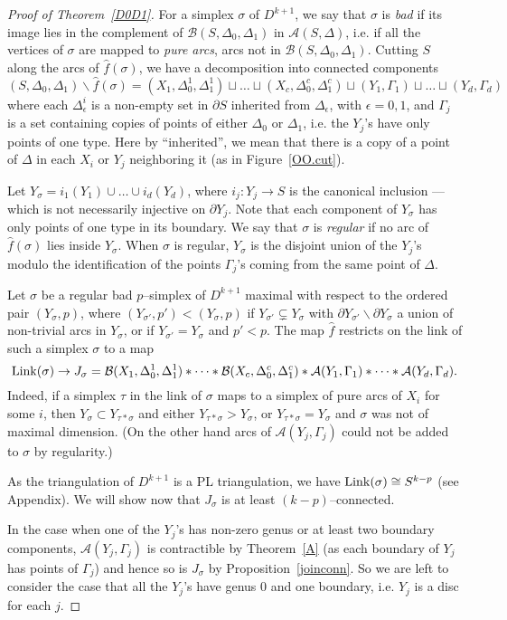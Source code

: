 \documentclass[10pt]{amsart}
\newcommand{\A}{\mathcal{A}}
\newcommand{\BB}{\mathcal{B}}
\newcommand{\Ga}{\Gamma}
\newcommand{\De}{\Delta}
\newcommand{\s}{\sigma}
\newcommand{\minus}{\backslash}
\newcommand{\del}{\partial}
\begin{document}
\begin{proof}[Proof of Theorem~\ref{D0D1}]
For a simplex $\s$ of $D^{k+1}$, we say that $\s$ is {\em bad} if its image lies in the complement of $\BB(S,\De_0,\De_1)$ in
$\A(S,\De)$,  i.e. if all the vertices of $\s$ are mapped to {\em pure arcs}, arcs not in $\BB(S,\De_0,\De_1)$.
 Cutting $S$ along the arcs of $\hat f(\s)$, we have a decomposition into connected components 
$$(S,\De_0,\De_1)\minus \hat f(\s)=(X_1,\De_0^1,\De^1_1)\sqcup\dots\sqcup (X_c,\De_0^c,\De_1^c)\sqcup (Y_1,\Ga_1)\sqcup \dots\sqcup (Y_d,\Ga_d)$$
where each $\De^i_\epsilon$ is a non-empty set in $\del S$ inherited from $\De_\epsilon$, with $\epsilon=0,1$, and
$\Ga_j$ is a set containing copies of points of 
either $\De_0$ or $\De_1$, i.e. the $Y_j$'s have only points of one type. Here by ``inherited'', we mean that there is a copy of a
point of $\De$ in each $X_i$ or $Y_j$ neighboring it (as in Figure~\ref{OO.cut}).

Let $Y_\s=i_1(Y_1)\cup \dots\cup i_d(Y_d)$, where $i_j\colon Y_j\to S$ is the canonical inclusion ---which is not necessarily injective on $\del Y_j$.  
Note that each component of $Y_\s$ has only points of one type in its boundary. 
We say that $\s$ is {\em regular} if no arc of $\hat f(\s)$ lies inside $Y_\s$. When $\s$ is regular, $Y_\s$ is the disjoint union of the
$Y_j$'s modulo the identification of 
the points $\Ga_j$'s coming from the same point of $\De$. 

Let $\s$ be a regular bad $p$--simplex of $D^{k+1}$ maximal with respect to the ordered pair $(Y_\s,p)$, where 
$(Y_{\s'},p')< (Y_\s,p)$ if $Y_{\s'}\varsubsetneq Y_\s$ with $\del Y_{\s'}\minus \del Y_\s$ a union of non-trivial arcs in $Y_\s$, or if $Y_{\s'}=Y_\s$ and $p'<p$. 
The map $\hat f$ restricts on the link of such a simplex $\s$ to a map 
$${\rm Link}(\s) \to J_\s=\BB(X_1,\De^1_0,\De_1^1)*\dots * \BB(X_c,\De^c_0,\De_1^c)* \A(Y_1,\Ga_1)* \dots * \A(Y_d,\Ga_d).$$
Indeed, if a simplex $\tau$ in the link of $\s$ maps to a simplex of pure arcs of $X_i$ for some $i$, then $Y_\s\subset Y_{\tau *\s}$ and either 
$Y_{\tau *\s}>Y_\s$, or $Y_{\tau *\s}=Y_\s$ and $\s$ was not of maximal dimension. (On the other hand arcs of $\A(Y_j,\Ga_j)$ 
could not be added to $\s$ by regularity.)

As the triangulation of $D^{k+1}$ is a PL triangulation, we have  ${\rm Link}(\s)\cong S^{k-p}$ (see Appendix). 
We will show now that $J_\s$ is at least $(k-p)$--connected. 

In the case when one of the $Y_j$'s has non-zero genus or at least two boundary components, $\A(Y_j,\Ga_j)$ is
contractible by Theorem~\ref{A} (as each boundary of $Y_j$ has points of $\Ga_j$) and hence so is
$J_\s$ by Proposition~\ref{joinconn}.  %
So we are left to consider the case that all the $Y_j$'s have genus 0 and one boundary, i.e. $Y_j$ is a disc for each $j$.  


\end{proof}
\end{document}
